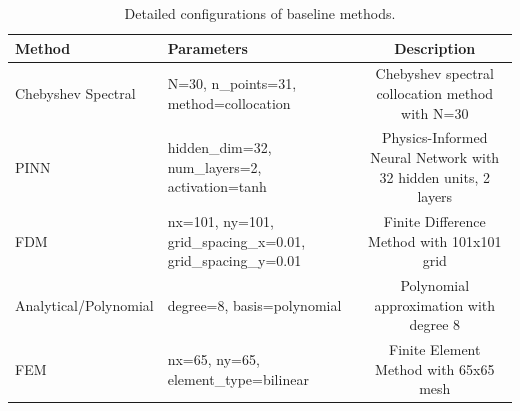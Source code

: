 \begin{table}[t]
\centering
\caption{Detailed configurations of baseline methods.}
\label{tab:baseline_details}
\begin{tabular}{lp{6cm}c}
\toprule
\textbf{Method} & \textbf{Parameters} & \textbf{Description} \\
\midrule
Chebyshev Spectral & N=30, n_points=31, method=collocation & Chebyshev spectral collocation method with N=30 \\
PINN & hidden_dim=32, num_layers=2, activation=tanh & Physics-Informed Neural Network with 32 hidden units, 2 layers \\
FDM & nx=101, ny=101, grid_spacing_x=0.01, grid_spacing_y=0.01 & Finite Difference Method with 101x101 grid \\
Analytical/Polynomial & degree=8, basis=polynomial & Polynomial approximation with degree 8 \\
FEM & nx=65, ny=65, element_type=bilinear & Finite Element Method with 65x65 mesh \\
\bottomrule
\end{tabular}
\end{table}